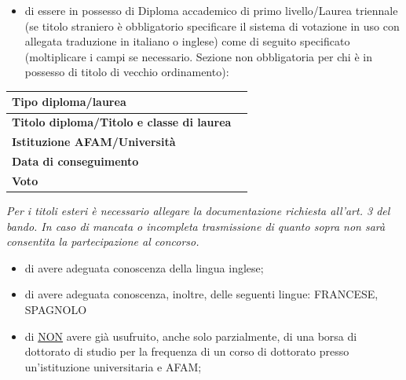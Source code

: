 \documentclass[a4paper,12pt]{article}
\newcommand{\linefill}[1]{\makebox[#1]{\hrulefill}}
\newcommand{\longline}{\linefill{8cm}}
\begin{document}
\begin{flushleft}
\begin{itemize}[leftmargin=0.5cm, itemsep=0.3cm, resume]
\item di essere in possesso di Diploma accademico di primo livello/Laurea triennale (se titolo straniero è obbligatorio specificare il sistema di votazione in uso con allegata traduzione in italiano o inglese) come di seguito specificato (moltiplicare i campi se necessario. Sezione non obbligatoria per chi è in possesso di titolo di vecchio ordinamento):

\end{itemize}

\begin{center}
\begin{tabularx}{\textwidth}{|X|X|}
\hline
\textbf{Tipo diploma/laurea} & \\[1cm]
\hline
\textbf{Titolo diploma/Titolo e classe di laurea} & \\[1cm]
\hline
\textbf{Istituzione AFAM/Università} & \\[1cm]
\hline
\textbf{Data di conseguimento} & \\[1cm]
\hline
\textbf{Voto} & \\[1cm]
\hline
\end{tabularx}
\end{center}

\vspace{0.5cm}
\textit{Per i titoli esteri è necessario allegare la documentazione richiesta all'art. 3 del bando. In caso di mancata o incompleta trasmissione di quanto sopra non sarà consentita la partecipazione al concorso.}

\begin{itemize}[leftmargin=0.5cm, itemsep=0.3cm, resume]

\item di avere adeguata conoscenza della lingua inglese;

\item di avere adeguata conoscenza, inoltre, delle seguenti lingue: FRANCESE, SPAGNOLO
%

\item di \uline{NON} avere già usufruito, anche solo parzialmente, di una borsa di dottorato di studio per la frequenza di un corso di dottorato presso un'istituzione universitaria e AFAM;


\end{itemize}
\end{flushleft}
\end{document}

